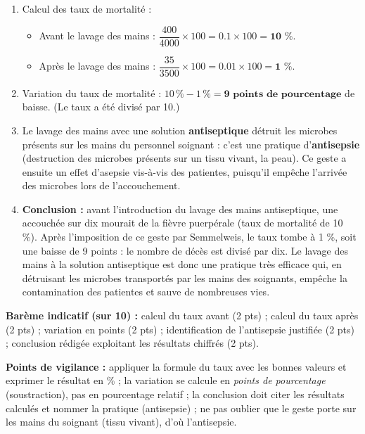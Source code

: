 \documentclass[11pt]{article}
\begin{document}
\begin{corrige}
\begin{enumerate}
\item Calcul des taux de mortalité :
\begin{itemize}
\item Avant le lavage des mains : $\dfrac{400}{\num{4000}} \times 100 = \num{0,1} \times 100 = \textbf{10 \%}$.
\item Après le lavage des mains : $\dfrac{35}{\num{3500}} \times 100 = \num{0,01} \times 100 = \textbf{1 \%}$.
\end{itemize}
\item Variation du taux de mortalité : $10\,\% - 1\,\% = \textbf{9 points de pourcentage}$ de baisse. (Le taux a été divisé par 10.)
\item Le lavage des mains avec une solution \textbf{antiseptique} détruit les microbes présents sur les mains du personnel soignant : c'est une pratique d'\textbf{antisepsie} (destruction des microbes présents sur un tissu vivant, la peau). Ce geste a ensuite un effet d'asepsie vis-à-vis des patientes, puisqu'il empêche l'arrivée des microbes lors de l'accouchement.
\item \textbf{Conclusion :} avant l'introduction du lavage des mains antiseptique, une accouchée sur dix mourait de la fièvre puerpérale (taux de mortalité de 10 \%). Après l'imposition de ce geste par Semmelweis, le taux tombe à 1 \%, soit une baisse de 9 points : le nombre de décès est divisé par dix. Le lavage des mains à la solution antiseptique est donc une pratique très efficace qui, en détruisant les microbes transportés par les mains des soignants, empêche la contamination des patientes et sauve de nombreuses vies.
\end{enumerate}
\textbf{Barème indicatif (sur 10) :} calcul du taux avant (2 pts) ; calcul du taux après (2 pts) ; variation en points (2 pts) ; identification de l'antisepsie justifiée (2 pts) ; conclusion rédigée exploitant les résultats chiffrés (2 pts).

\textbf{Points de vigilance :} appliquer la formule du taux avec les bonnes valeurs et exprimer le résultat en \% ; la variation se calcule en \emph{points de pourcentage} (soustraction), pas en pourcentage relatif ; la conclusion doit citer les résultats calculés et nommer la pratique (antisepsie) ; ne pas oublier que le geste porte sur les mains du soignant (tissu vivant), d'où l'antisepsie.
\end{corrige}
\end{document}

